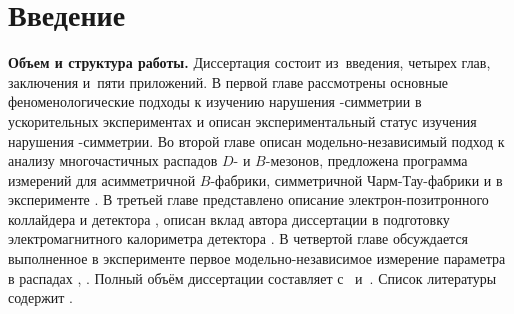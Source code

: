 \chapter*{Введение}							%

\newcommand{\actuality}{}
\newcommand{\progress}{}
\newcommand{\aim}{\textbf{Целью}}
\newcommand{\tasks}{\textbf{задачи}}
\newcommand{\defpositions}{\textbf{Основные положения, выносимые на~защиту:}}
\newcommand{\novelty}{\textbf{Научная новизна:}}
\newcommand{\influence}{\textbf{Научная и практическая значимость}}
\newcommand{\reliability}{\textbf{Степень достоверности}}
\newcommand{\probation}{\textbf{Апробация работы.}}
\newcommand{\contribution}{\textbf{Личный вклад.}}
\newcommand{\publications}{\textbf{Публикации.}}


\textbf{Объем и структура работы.} Диссертация состоит из~введения, четырех глав, заключения и~пяти приложений.  В первой главе рассмотрены основные феноменологические подходы к изучению нарушения \cpconj-симметрии в ускорительных экспериментах и описан экспериментальный статус изучения нарушения \cpconj-симметрии.  Во второй главе описан модельно-независимый подход к анализу многочастичных распадов $D$- и $B$-мезонов, предложена программа измерений для асимметричной $B$-фабрики, симметричной Чарм-Тау-фабрики и в эксперименте \lhcb.  В третьей главе представлено описание электрон-позитронного коллайдера \kekb и детектора \belle, описан вклад автора диссертации в подготовку электромагнитного калориметра детектора \belleii.  В четвертой главе обсуждается выполненное в эксперименте \belle первое модельно-независимое измерение параметра \pphi в распадах \bdsth, \dbkpp.  
%
Полный объём диссертации составляет  
с~
и~. Список литературы содержит  
.

